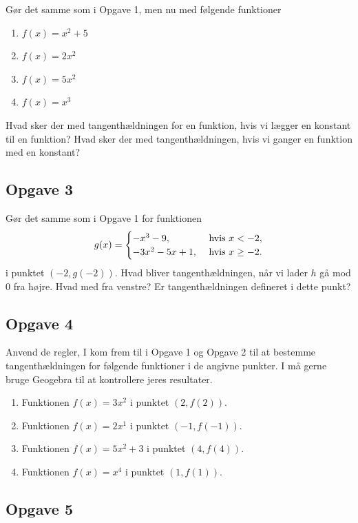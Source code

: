 Gør det samme som i Opgave 1, men nu med følgende funktioner
\begin{enumerate}[label=\roman*)]
	\item $f(x) = x^2 + 5$
	\item $f(x) = 2x^2$
	\item $f(x) = 5x^2$
	\item $f(x) = x^3$
\end{enumerate}

Hvad sker der med tangenthældningen for en funktion, hvis vi lægger en konstant til en funktion? Hvad sker der med tangenthældningen, hvis vi ganger en funktion med en konstant?

\subsection*{Opgave 3}

Gør det samme som i Opgave 1 for funktionen
\begin{align*}
	g(x) = 
	\begin{cases}
		-x^3 - 9, &\textnormal{ hvis } x < -2,\\
		-3x^2- 5x + 1, &\textnormal{ hvis } x \geq -2. 
	\end{cases}
\end{align*}
i punktet $(-2,g(-2))$. Hvad bliver tangenthældningen, når vi lader $h$ gå mod 0 fra højre. Hvad med fra venstre? Er tangenthældningen defineret i dette punkt?

\newpage

\subsection*{Opgave 4}

Anvend de regler, I kom frem til i Opgave 1 og Opgave 2 til at bestemme tangenthældningen for følgende funktioner i de angivne punkter. I må gerne bruge Geogebra til at kontrollere jeres resultater.

\begin{enumerate}[label=\roman*)]
	\item Funktionen $f(x) = 3x^2$ i punktet $(2,f(2))$.
	\item Funktionen $f(x) = 2x^1$ i punktet $(-1,f(-1))$.
	\item Funktionen $f(x) = 5x^2 + 3$ i punktet $(4,f(4))$.
	\item Funktionen $f(x) = x^4$ i punktet $(1,f(1))$.
\end{enumerate}

\subsection*{Opgave 5}

